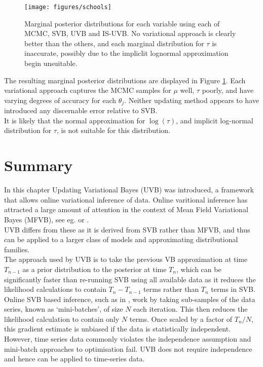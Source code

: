 \documentclass[
12pt, %
onehalfspacing, %
nohyperref, %
headsepline, %
chapterinoneline, %
]{MastersDoctoralThesis} %
\begin{document}
\begin{figure}[htbp]
\centering
\texttt{[image: figures/schools]}
\caption{Marginal posterior distributions for each variable using each of MCMC, SVB, UVB and IS-UVB. No variational approach is clearly better than the others, and each marginal distribution for $\tau$ is inaccurate, possibly due to the impliclit lognormal approximation begin unsuitable.}
\label{fig:schools}
\end{figure}

The resulting marginal posterior distributions are displayed in Figure \ref{fig:schools}. Each variational approach captures the MCMC samples for $\mu$ well, $\tau$ poorly, and have varying degrees of accuracy for each $\theta_j$. Neither updating method appears to have introduced any discernable error relative to SVB. 
\\

It is likely that the normal approximation for $\log(\tau)$, and implicit log-normal distribution for $\tau$, is not suitable for this distribution.

\section{Summary}
\label{sec:UVBSummary}

In this chapter Updating Variational Bayes (UVB) was introduced, a framework that allows online variational inference of data. Online varitional inference has attracted a large amount of attention in the context of Mean Field Variational Bayes (MFVB), see eg. \cite{Hoffman2010} or \cite{Broderick2013}. 
\\

UVB differs from these as it is derived from SVB rather than MFVB, and thus can be applied to a larger class of models and approximating distributional families.
\\

The approach used by UVB is to take the previous VB approximation at time $T_{n-1}$ as a prior distribution to the posterior at time $T_{n}$, which can be significantly faster than re-running SVB using all available data as it reduces the likelihood calculations to contain $T_{n} - T_{n-1}$ terms rather than $T_{n}$ terms in SVB. 
\\

Online SVB based inference, such as in \citet{Paisley2012}, work by taking sub-samples of the data series, known as `mini-batches', of size $N$ each iteration. This then reduces the likelihood calculation to contain only $N$ terms. Once scaled by a factor of $T_{n} / N$,  this gradient estimate is unbiased if the data is statistically independent. However, time series data commonly violates the independence assumption and mini-batch approaches to optimisation fail. UVB does not require independence and hence can be applied to time-series data.  
\\
\end{document}
